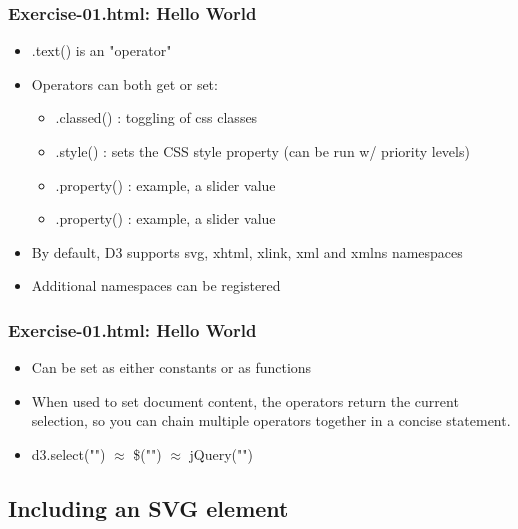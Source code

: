 \documentclass{beamer}
\begin{document}
\begin{frame}
    \frametitle{Exercise-01.html: Hello World}
    \begin{itemize}
    \item .text() is an "operator"
    \item Operators can both get or set:
        \begin{itemize}
        \item .classed() : toggling of css classes
        \item .style() : sets the CSS style property (can be run w/ priority levels)
        \item .property() : example, a slider value
        \item .property() : example, a slider value
        \end{itemize}
    \item By default, D3 supports svg, xhtml, xlink, xml and xmlns namespaces
    \item Additional namespaces can be registered
    \end{itemize}
\end{frame}


\begin{frame}
    \frametitle{Exercise-01.html: Hello World}
    \begin{itemize}
    \item Can be set as either constants or as functions
    \item When used to set document content, the operators return the current selection, so you can chain multiple operators together in a concise statement.
    \item d3.select("") $\approx$ \$("") $\approx$ jQuery("")
    \end{itemize}
\end{frame}




\subsection{Including an SVG element}
\end{document}
